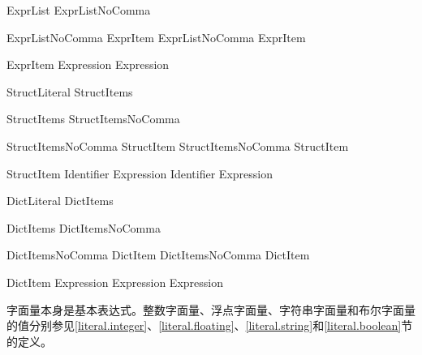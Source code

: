 \begin{bnf}{ExprList}
    ExprListNoComma \terminal{,}\bnfq
\end{bnf}

\begin{bnf}{ExprListNoComma}
    ExprItem \br
    ExprListNoComma \terminal{,} ExprItem
\end{bnf}

\begin{bnf}{ExprItem}
    Expression \br
     Expression
\end{bnf}

\begin{bnf}{StructLiteral}
    \terminal{(} StructItems\bnfq \terminal{)}
\end{bnf}

\begin{bnf}{StructItems}
    StructItemsNoComma \terminal{,}\bnfq
\end{bnf}

\begin{bnf}{StructItemsNoComma}
    StructItem \br
    StructItemsNoComma \terminal{,} StructItem
\end{bnf}

\begin{bnf}{StructItem}
    Identifier \terminal{:} Expression \br
    Identifier \br
     Expression
\end{bnf}

\begin{bnf}{DictLiteral}
    \terminal{[} DictItems \terminal{]} \br
    \terminal{[} \terminal{:} \terminal{]}
\end{bnf}

\begin{bnf}{DictItems}
    DictItemsNoComma \terminal{,}\bnfq
\end{bnf}

\begin{bnf}{DictItemsNoComma}
    DictItem \br
    DictItemsNoComma \terminal{,} DictItem
\end{bnf}

\begin{bnf}{DictItem}
    Expression \terminal{:} Expression \br
     Expression
\end{bnf}

\pnum
字面量本身是基本表达式。整数字面量、浮点字面量、字符串字面量和布尔字面量的值分别参见\ref{literal.integer}、\ref{literal.floating}、\ref{literal.string}和\ref{literal.boolean}节的定义。

